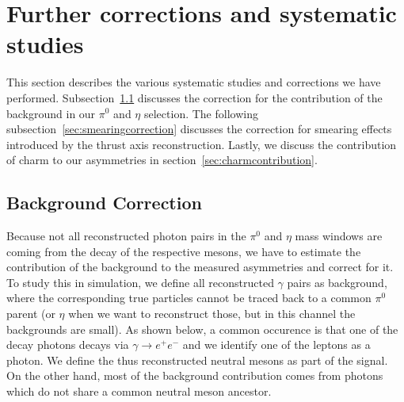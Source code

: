 \section{Further corrections and systematic studies}
\label{sec:sysStudies}
This section describes the various systematic studies and corrections we have performed. 
Subsection~\ref{sec:backgroundcorrection} discusses the correction for the  contribution of the background in our $\pi^0$ and $\eta$ selection. 
The following subsection~\ref{sec:smearingcorrection} discusses the correction for smearing effects introduced by the thrust axis reconstruction. Lastly, we discuss the contribution of charm to our asymmetries in section~\ref{sec:charmcontribution}.
\subsection{Background Correction}
\label{sec:backgroundcorrection}
Because not all reconstructed photon pairs in the $\pi^0$ and $\eta$ mass windows are coming from the decay of the respective mesons, we have to estimate the contribution of the background to the measured asymmetries and correct for it.
To study this in simulation, we define all reconstructed $\gamma$ pairs as background, where the corresponding true particles cannot be traced back to a common $\pi^0$ parent (or $\eta$ when we want to reconstruct those, but in this channel the backgrounds are small). 
As shown below, a common occurence is that one of the decay photons decays via $\gamma \rightarrow e^+e^-$ and we identify one of the leptons as a photon. We define the thus reconstructed neutral mesons as part of the signal. 
On the other hand, most of the background contribution comes from photons which do not share a common neutral meson ancestor.

